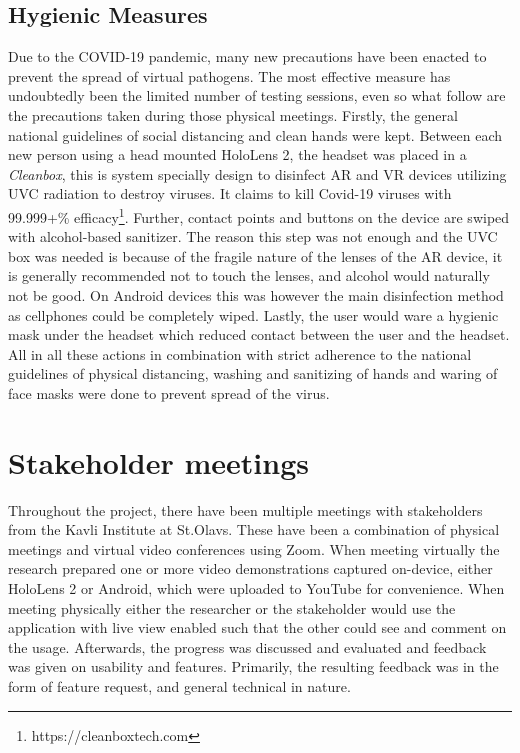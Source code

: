 \subsection*{Hygienic Measures}
Due to the COVID-19 pandemic, many new precautions have been enacted to prevent the spread of virtual pathogens. The most effective measure has undoubtedly been the limited number of testing sessions, even so what follow are the precautions taken during those physical meetings. 
Firstly, the general national guidelines of social distancing and clean hands were kept. 
Between each new person using a head mounted HoloLens 2, the headset was placed in a \textit{Cleanbox}, this is system specially design to disinfect AR and VR devices utilizing UVC radiation to destroy viruses. It claims to kill Covid-19 viruses with 99.999+\% efficacy\footnote{https://cleanboxtech.com}. Further, contact points and buttons on the device are swiped with alcohol-based sanitizer. The reason this step was not enough and the UVC box was needed is because of the fragile nature of the lenses of the AR device, it is generally recommended not to touch the lenses, and alcohol would naturally not be good. On Android devices this was however the main disinfection method as cellphones could be completely wiped. Lastly, the user would ware a hygienic mask under the headset which reduced contact between the user and the headset.
All in all these actions in combination with strict adherence to the national guidelines of physical distancing, washing and sanitizing of hands and waring of face masks were done to prevent spread of the virus. 


\section{Stakeholder meetings}
Throughout the project, there have been multiple meetings with stakeholders from the Kavli Institute at St.Olavs. These have been a combination of physical meetings and virtual video conferences using Zoom. When meeting virtually the research prepared one or more video demonstrations captured on-device, either HoloLens 2 or Android, which were uploaded to YouTube for convenience. When meeting physically either the researcher or the stakeholder would use the application with live view enabled such that the other could see and comment on the usage. Afterwards, the progress was discussed and evaluated and feedback was given on usability and features. Primarily, the resulting feedback was in the form of feature request, and general technical in nature.

